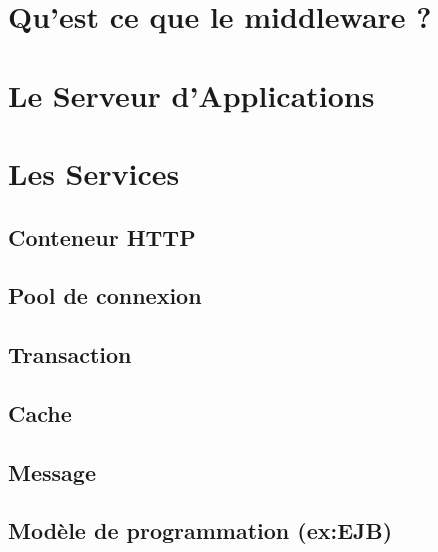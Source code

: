 

\section{Qu'est ce que le middleware ?}

\newpage
\section{Le Serveur d'Applications}

\section{Les Services}

\subsection{Conteneur HTTP}

\subsection{Pool de connexion}

\subsection{Transaction}

\subsection{Cache}

\subsection{Message}

\subsection{Modèle de programmation (ex:EJB)}

